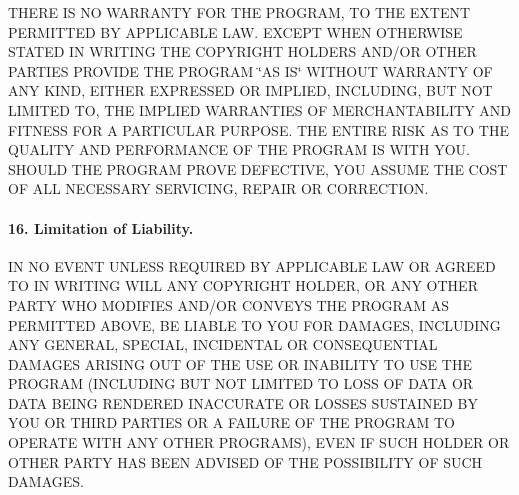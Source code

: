 T\+H\+E\+RE IS NO W\+A\+R\+R\+A\+N\+TY F\+OR T\+HE P\+R\+O\+G\+R\+AM, TO T\+HE E\+X\+T\+E\+NT P\+E\+R\+M\+I\+T\+T\+ED BY A\+P\+P\+L\+I\+C\+A\+B\+LE L\+AW. E\+X\+C\+E\+PT W\+H\+EN O\+T\+H\+E\+R\+W\+I\+SE S\+T\+A\+T\+ED IN W\+R\+I\+T\+I\+NG T\+HE C\+O\+P\+Y\+R\+I\+G\+HT H\+O\+L\+D\+E\+RS A\+N\+D/\+OR O\+T\+H\+ER P\+A\+R\+T\+I\+ES P\+R\+O\+V\+I\+DE T\+HE P\+R\+O\+G\+R\+AM \char`\"{}\+A\+S I\+S\char`\"{} W\+I\+T\+H\+O\+UT W\+A\+R\+R\+A\+N\+TY OF A\+NY K\+I\+ND, E\+I\+T\+H\+ER E\+X\+P\+R\+E\+S\+S\+ED OR I\+M\+P\+L\+I\+ED, I\+N\+C\+L\+U\+D\+I\+NG, B\+UT N\+OT L\+I\+M\+I\+T\+ED TO, T\+HE I\+M\+P\+L\+I\+ED W\+A\+R\+R\+A\+N\+T\+I\+ES OF M\+E\+R\+C\+H\+A\+N\+T\+A\+B\+I\+L\+I\+TY A\+ND F\+I\+T\+N\+E\+SS F\+OR A P\+A\+R\+T\+I\+C\+U\+L\+AR P\+U\+R\+P\+O\+SE. T\+HE E\+N\+T\+I\+RE R\+I\+SK AS TO T\+HE Q\+U\+A\+L\+I\+TY A\+ND P\+E\+R\+F\+O\+R\+M\+A\+N\+CE OF T\+HE P\+R\+O\+G\+R\+AM IS W\+I\+TH Y\+OU. S\+H\+O\+U\+LD T\+HE P\+R\+O\+G\+R\+AM P\+R\+O\+VE D\+E\+F\+E\+C\+T\+I\+VE, Y\+OU A\+S\+S\+U\+ME T\+HE C\+O\+ST OF A\+LL N\+E\+C\+E\+S\+S\+A\+RY S\+E\+R\+V\+I\+C\+I\+NG, R\+E\+P\+A\+IR OR C\+O\+R\+R\+E\+C\+T\+I\+ON.

\paragraph*{16. Limitation of Liability.}

IN NO E\+V\+E\+NT U\+N\+L\+E\+SS R\+E\+Q\+U\+I\+R\+ED BY A\+P\+P\+L\+I\+C\+A\+B\+LE L\+AW OR A\+G\+R\+E\+ED TO IN W\+R\+I\+T\+I\+NG W\+I\+LL A\+NY C\+O\+P\+Y\+R\+I\+G\+HT H\+O\+L\+D\+ER, OR A\+NY O\+T\+H\+ER P\+A\+R\+TY W\+HO M\+O\+D\+I\+F\+I\+ES A\+N\+D/\+OR C\+O\+N\+V\+E\+YS T\+HE P\+R\+O\+G\+R\+AM AS P\+E\+R\+M\+I\+T\+T\+ED A\+B\+O\+VE, BE L\+I\+A\+B\+LE TO Y\+OU F\+OR D\+A\+M\+A\+G\+ES, I\+N\+C\+L\+U\+D\+I\+NG A\+NY G\+E\+N\+E\+R\+AL, S\+P\+E\+C\+I\+AL, I\+N\+C\+I\+D\+E\+N\+T\+AL OR C\+O\+N\+S\+E\+Q\+U\+E\+N\+T\+I\+AL D\+A\+M\+A\+G\+ES A\+R\+I\+S\+I\+NG O\+UT OF T\+HE U\+SE OR I\+N\+A\+B\+I\+L\+I\+TY TO U\+SE T\+HE P\+R\+O\+G\+R\+AM (I\+N\+C\+L\+U\+D\+I\+NG B\+UT N\+OT L\+I\+M\+I\+T\+ED TO L\+O\+SS OF D\+A\+TA OR D\+A\+TA B\+E\+I\+NG R\+E\+N\+D\+E\+R\+ED I\+N\+A\+C\+C\+U\+R\+A\+TE OR L\+O\+S\+S\+ES S\+U\+S\+T\+A\+I\+N\+ED BY Y\+OU OR T\+H\+I\+RD P\+A\+R\+T\+I\+ES OR A F\+A\+I\+L\+U\+RE OF T\+HE P\+R\+O\+G\+R\+AM TO O\+P\+E\+R\+A\+TE W\+I\+TH A\+NY O\+T\+H\+ER P\+R\+O\+G\+R\+A\+MS), E\+V\+EN IF S\+U\+CH H\+O\+L\+D\+ER OR O\+T\+H\+ER P\+A\+R\+TY H\+AS B\+E\+EN A\+D\+V\+I\+S\+ED OF T\+HE P\+O\+S\+S\+I\+B\+I\+L\+I\+TY OF S\+U\+CH D\+A\+M\+A\+G\+ES.

